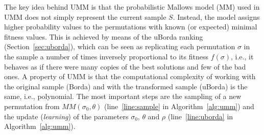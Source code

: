 \documentclass[runningheads]{llncs}
\begin{document}
The key idea behind UMM is that the probabilistic Mallows model (MM) used in
UMM does not simply represent the current sample $S$. Instead, the model
assigns higher probability values to the permutations with known (or expected)
minimal fitness values. This is achieved by means of the uBorda ranking
(Section~\ref{sec:uborda}), which can be seen as replicating each permutation
$\sigma$ in the sample a number of times inversely proportional to its fitness
$f(\sigma)$, i.e., it behaves as if there were many copies of the best
solutions and few of the bad ones. A property of UMM is that the
computational complexity of working with the original sample (Borda) and with the
transformed sample (uBorda) is the same, i.e., polynomial. The most important steps are
the sampling of a new permutation from $MM(\sigma_0,\theta)$ (line~\ref{line:sample} in Algorithm~\ref{alg:umm}) and the update
(\emph{learning}) of the parameters $\sigma_0$, $\theta$ and $\rho$ (line~\ref{line:uborda} in Algorithm~\ref{alg:umm}).






\newcommand{\Edist}{\ensuremath{\mathbb{E}[D]}}
\end{document}
